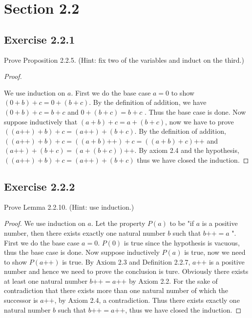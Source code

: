 \documentclass[a4paper]{article}
\begin{document}
\section*{Section 2.2}

\subsection*{Exercise 2.2.1}

Prove Proposition 2.2.5. (Hint: fix two of the variables and induct on the third.)

\begin{proof}

$ $\newline

We use induction on $a$. First we do the base case $a = 0$ to show $\left( 0+b \right) +c = 0+\left( b+c \right) $. By the definition of addition, we have $\left( 0+b \right) +c = b + c$ and $0+\left( b+c \right) = b+c$ . Thus the base case is done. Now suppose inductively that $\left( a+b \right) +c = a+\left( b+c \right) $, now we have to prove $\left( \left(  a \text{++} \right) +b \right) +c = \left( a \text{++} \right)  +\left( b+c \right) $. By the definition of addition, $\left( \left(  a \text{++} \right) +b \right) +c = \left( \left( a + b \right) \text{++} \right) + c = \left( \left( a + b \right)  + c \right) \text{++} $ and $\left( a \text{++} \right)  +\left( b+c \right) = \left( a + \left( b + c \right)  \right) \text{++} $. By axiom 2.4 and the hypothesis, $\left( \left( a \text{++} \right) + b \right) + c = \left( a \text{++} \right) + \left( b + c \right) $ thus we have closed the induction.

\end{proof}

\subsection*{Exercise 2.2.2}

Prove Lemma 2.2.10. (Hint: use induction.)

\begin{proof}

We use induction on $a$. Let the property  $P(a)$ to be "if $a$ is a positive number, then there exists exactly one natural number $b$ such that $b\text{++} = a$ ". First we do the base case $a = 0$. $P(0)$ is true since the hypothesis is vacuous, thus the base case is done. Now suppose inductively $P(a)$ is true, now we need to show  $P(a\text{++})$ is true. By Axiom 2.3 and Definition 2.2.7, $a\text{++}$ is a positive number and hence we need to prove the conclusion is ture. Obviously there exists at least one natural number $b\text{++} = a\text{++}$ by Axiom 2.2. For the sake of contradiction that there exists more than one natural number of which the successor is $a\text{++}$, by Axiom 2.4, a contradiction. Thus there exists exactly one natural number $b$ such that $b\text{++} = a\text{++}$, thus we have closed the induction.

\end{proof}
\end{document}
